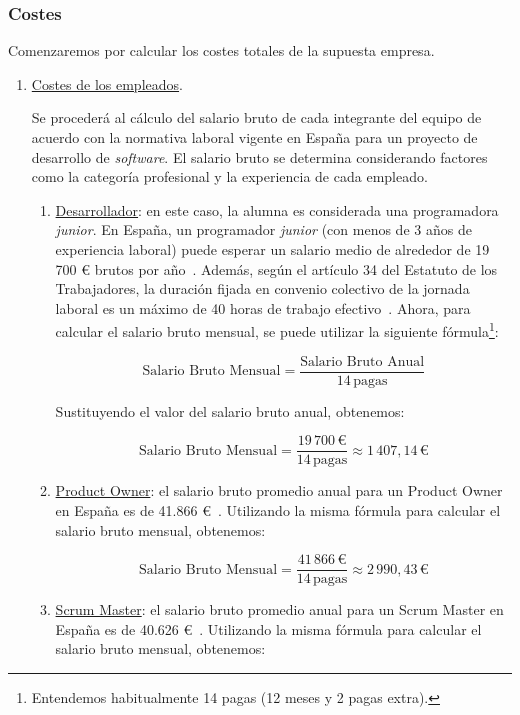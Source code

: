 \subsubsection{Costes}
Comenzaremos por calcular los costes totales de la supuesta empresa.

\begin{enumerate}
    \item \underline{Costes de los empleados}.
    
    Se procederá al cálculo del salario bruto de cada integrante del equipo de acuerdo con la normativa laboral vigente en España para un proyecto de desarrollo de \textit{software}. El salario bruto se determina considerando factores como la categoría profesional y la experiencia de cada empleado.

    \begin{enumerate}
        \item \underline{Desarrollador}: en este caso, la alumna es considerada una programadora \textit{junior}. En España, un programador \textit{junior} (con menos de 3 años de experiencia laboral) puede esperar un salario medio de alrededor de 19\,700 € brutos por año~\cite{Jobted}. Además, según el artículo 34 del Estatuto de los Trabajadores, la duración fijada en convenio colectivo de la jornada laboral es un máximo de 40 horas de trabajo efectivo~\cite{jornadalaboral}. Ahora, para calcular el salario bruto mensual, se puede utilizar la siguiente fórmula\footnote{Entendemos habitualmente 14 pagas (12 meses y 2 pagas extra).}:

        \[
        \text{{Salario Bruto Mensual}} = \frac{{\text{{Salario Bruto Anual}}}}{{14 \, \text{{pagas}}}}
        \]
        
        Sustituyendo el valor del salario bruto anual, obtenemos:
        
        \[
        \text{{Salario Bruto Mensual}} = \frac{{19\,700 \,\text{{€}}}}{{14  \,\text{{pagas}}}} \approx 1\,407,14 \, \text{{€}}
        \]

        \item \underline{Product Owner}: el salario bruto promedio anual para un Product Owner en España es de 41.866 €~\cite{PayScale2}. Utilizando la misma fórmula para calcular el salario bruto mensual, obtenemos:

        \[\text{{Salario Bruto Mensual}} = \frac{{41\,866 \, \text{{€}}}}{{14 \, \text{{pagas}}}} \approx 2\,990,43 \,\text{{€}}\]
        
        \item \underline{Scrum Master}: el salario bruto promedio anual para un Scrum Master en España es de 40.626 €~\cite{PayScale1}. Utilizando la misma fórmula para calcular el salario bruto mensual, obtenemos:
        

\end{enumerate}
\end{enumerate}
